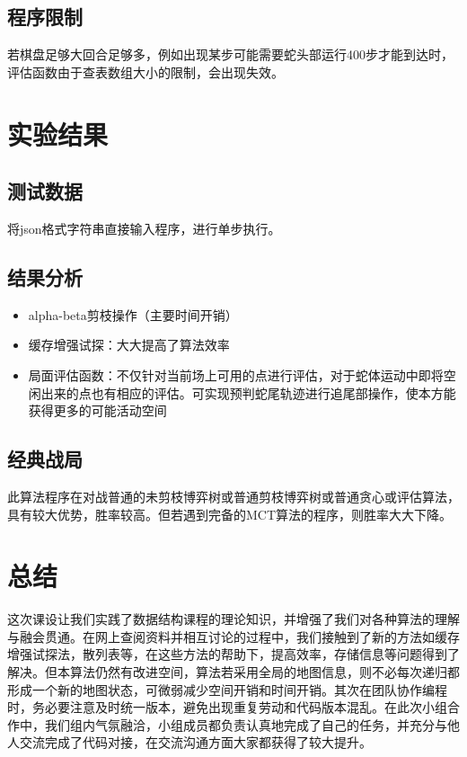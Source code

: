 \documentclass{ctexrep}
\begin{document}
\section{程序限制}
若棋盘足够大回合足够多，例如出现某步可能需要蛇头部运行400步才能到达时，评估函数由于查表数组大小的限制，会出现失效。


\chapter{实验结果}



\section{测试数据}
将json格式字符串直接输入程序，进行单步执行。


\section{结果分析}
\begin{itemize}
    \item alpha-beta剪枝操作（主要时间开销）
    \item 缓存增强试探：大大提高了算法效率
    \item 局面评估函数：不仅针对当前场上可用的点进行评估，对于蛇体运动中即将空闲出来的点也有相应的评估。可实现预判蛇尾轨迹进行追尾部操作，使本方能获得更多的可能活动空间
\end{itemize}


\section{经典战局}
此算法程序在对战普通的未剪枝博弈树或普通剪枝博弈树或普通贪心或评估算法，具有较大优势，胜率较高。但若遇到完备的MCT算法的程序，则胜率大大下降。










{\let\clearpage\relax\chapter*{总结}}

这次课设让我们实践了数据结构课程的理论知识，并增强了我们对各种算法的理解与融会贯通。在网上查阅资料并相互讨论的过程中，我们接触到了新的方法如缓存增强试探法，散列表等，在这些方法的帮助下，提高效率，存储信息等问题得到了解决。但本算法仍然有改进空间，算法若采用全局的地图信息，则不必每次递归都形成一个新的地图状态，可微弱减少空间开销和时间开销。其次在团队协作编程时，务必要注意及时统一版本，避免出现重复劳动和代码版本混乱。在此次小组合作中，我们组内气氛融洽，小组成员都负责认真地完成了自己的任务，并充分与他人交流完成了代码对接，在交流沟通方面大家都获得了较大提升。
\end{document}
